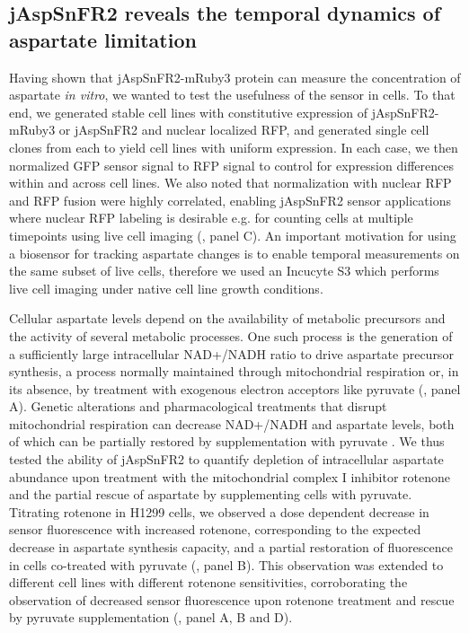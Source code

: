 \documentclass[9pt,lineno]{elife}
\begin{document}
\subsection{jAspSnFR2 reveals the temporal dynamics of aspartate limitation}
Having shown that jAspSnFR2-mRuby3 protein can measure the concentration of aspartate \textit{in vitro}, we wanted to test the usefulness of the sensor in cells.
To that end, we generated stable cell lines with constitutive expression of jAspSnFR2-mRuby3 or jAspSnFR2 and nuclear localized RFP, and generated single cell clones from each to yield cell lines with uniform expression.
In each case, we then normalized GFP sensor signal to RFP signal to control for expression differences within and across cell lines.
We also noted that normalization with nuclear RFP and RFP fusion were highly correlated, enabling jAspSnFR2 sensor applications where nuclear RFP labeling is desirable e.g. for counting cells at multiple timepoints using live cell imaging (, panel C).
An important motivation for using a biosensor for tracking aspartate changes is to enable temporal measurements on the same subset of live cells, therefore we used an Incucyte S3 which performs live cell imaging under native cell line growth conditions.

Cellular aspartate levels depend on the availability of metabolic precursors and the activity of several metabolic processes.
One such process is the generation of a sufficiently large intracellular NAD+/NADH ratio to drive aspartate precursor synthesis, a process normally maintained through mitochondrial respiration or, in its absence, by treatment with exogenous electron acceptors like pyruvate (, panel A).
Genetic alterations and pharmacological treatments that disrupt mitochondrial respiration can decrease NAD+/NADH and aspartate levels, both of which can be partially restored by supplementation with pyruvate \citep{Sullivan2015-xf, Birsoy2015-pg}.
We thus tested the ability of jAspSnFR2 to quantify depletion of intracellular aspartate abundance upon treatment with the mitochondrial complex I inhibitor rotenone and the partial rescue of aspartate by supplementing cells with pyruvate.
Titrating rotenone in H1299 cells, we observed a dose dependent decrease in sensor fluorescence with increased rotenone, corresponding to the expected decrease in aspartate synthesis capacity, and a partial restoration of fluorescence in cells co-treated with pyruvate (, panel B).
This observation was extended to different cell lines with different rotenone sensitivities, corroborating the observation of decreased sensor fluorescence upon rotenone treatment and rescue by pyruvate supplementation (, panel A, B and D).
\end{document}
